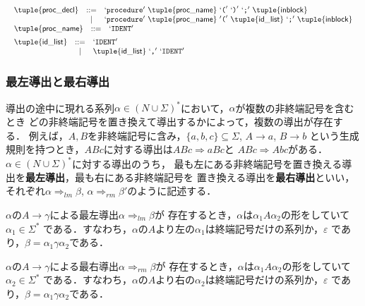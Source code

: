 \documentclass[dvipdfmx,a4j]{jbook}
\begin{document}
\[\begin{array}{l}
\begin{array}{rcl}
  \tuple{\mathsf{proc\_decl}} & \mathtt{::=} & `\texttt{procedure}'\ \tuple{\mathsf{proc\_name}}\ `\texttt{(}'\ `\texttt{)}'\ `\texttt{;}'\ \tuple{\mathsf{inblock}}\\
  & | & `\texttt{procedure}'\ \tuple{\mathsf{proc\_name}}\ '\texttt{(}'\ \tuple{\mathsf{id\_list}}\ `\texttt{;}'\ \tuple{\mathsf{inblock}}\\ 
\end{array}\\[5pt]
\begin{array}{rcl}
  \tuple{\mathsf{proc\_name}} & \mathtt{::=} & `\texttt{IDENT}'
\end{array}\\[5pt]
\begin{array}{rcl}
  \tuple{\mathsf{id\_list}} & \mathtt{::=} & `\texttt{IDENT}'\\
  & | & \tuple{\mathsf{id\_list}}\ `\texttt{,}'\ `\texttt{IDENT}'
\end{array}
\end{array}\]

\subsubsection{最左導出と最右導出}

導出の途中に現れる系列$\alpha\in(N\cup\Sigma)^\ast$において，$\alpha$が複数の非終端記号を含むとき
どの非終端記号を置き換えて導出するかによって，複数の導出が存在する．
例えば，$A,B$を非終端記号に含み，$\{a,b,c\}\subseteq\Sigma$, $A\rightarrow a$, $B\rightarrow b$
という生成規則を持つとき，$ABc$に対する導出は$ABc\Rightarrow aBc$と
$ABc\Rightarrow Abc$がある．$\alpha\in(N\cup\Sigma)^\ast$に対する導出のうち，
最も左にある非終端記号を置き換える導出を{\bf 最左導出}，最も右にある非終端記号を
置き換える導出を{\bf 最右導出}といい，それぞれ$\alpha\Rightarrow_{lm}\beta$,
$\alpha\Rightarrow_{rm}\beta'$のように記述する．

$\alpha$の$A\rightarrow\gamma$による最左導出$\alpha\Rightarrow_{lm}\beta$が
存在するとき，$\alpha$は$\alpha_1 A\alpha_2$の形をしていて$\alpha_1\in\Sigma^\ast$
である．すなわち，$\alpha$の$A$より左の$\alpha_1$は終端記号だけの系列か，$\varepsilon$
であり，$\beta=\alpha_1\gamma\alpha_2$である．

$\alpha$の$A\rightarrow\gamma$による最右導出$\alpha\Rightarrow_{rm}\beta$が
存在するとき，$\alpha$は$\alpha_1 A\alpha_2$の形をしていて$\alpha_2\in\Sigma^\ast$
である．すなわち，$\alpha$の$A$より右の$\alpha_2$は終端記号だけの系列か，$\varepsilon$
であり，$\beta=\alpha_1\gamma\alpha_2$である．
\end{document}
